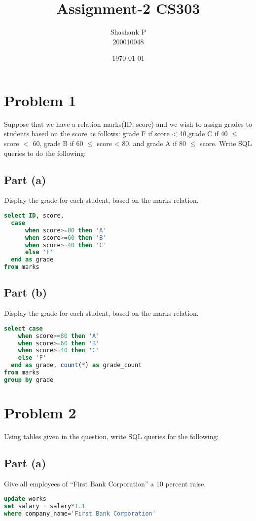 \documentclass{article}
\title{Assignment-2 CS303}
\author{Shashank P \\ 200010048}
\date{\today}
\begin{document}
\maketitle




\section{Problem 1}
Suppose that we have a relation marks(ID, score) and we wish to assign grades to students based on the
score as follows: grade F if score < 40,grade C if 40 $\leq$ score $<$ 60, grade B if 60 $\leq$ score < 80, and grade
A if 80 $\leq$ score. Write SQL queries to do the following:
\subsection{Part (a)}
Display the grade for each student, based on the marks relation.
\begin{lstlisting}[language=sql]
select ID, score,
  case 
      when score>=80 then 'A'
      when score>=60 then 'B'
      when score>=40 then 'C'
      else 'F'
  end as grade
from marks
\end{lstlisting}

\subsection{Part (b)}
Display the grade for each student, based on the marks relation.
\begin{lstlisting}[language=sql]
select case 
    when score>=80 then 'A'
    when score>=60 then 'B'
    when score>=40 then 'C'
    else 'F'
  end as grade, count(*) as grade_count
from marks
group by grade
\end{lstlisting}

\newpage
\section{Problem 2}
Using tables given in the question, write SQL queries for the following:
\subsection{Part (a)}
Give all employees of “First Bank Corporation” a 10 percent raise.
\begin{lstlisting}[language=sql]
update works
set salary = salary*1.1
where company_name='First Bank Corporation'
\end{lstlisting}
\end{document}
